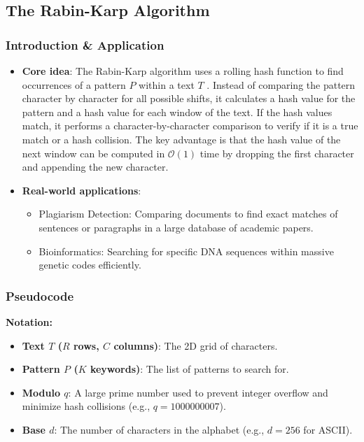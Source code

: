\subsection{The Rabin-Karp Algorithm}

\subsubsection{Introduction \& Application}
\begin{itemize}
    \item \textbf{Core idea}: The Rabin-Karp algorithm uses a rolling hash function to find occurrences of a pattern $P$ within a text $T$ \cite{cormen2022introduction}. 
    Instead of comparing the pattern character by character for all possible shifts, it calculates a hash value for the pattern and a hash value for each window of the text. 
    If the hash values match, it performs a character-by-character comparison to verify if it is a true match or a hash collision. 
    The key advantage is that the hash value of the next window can be computed in $\mathcal{O}(1)$ time by dropping the first character and appending the new character.
    \item \textbf{Real-world applications}:
    \begin{itemize}
        \item Plagiarism Detection: Comparing documents to find exact matches of sentences or paragraphs in a large database of academic papers.
        \item Bioinformatics: Searching for specific DNA sequences within massive genetic codes efficiently.
    \end{itemize}
\end{itemize}

\subsubsection{Pseudocode}
\textbf{Notation:}
\begin{itemize}
    \item \textbf{Text $T$ ($R$ rows, $C$ columns)}: The 2D grid of characters.
    \item \textbf{Pattern $P$ ($K$ keywords)}: The list of patterns to search for.
    \item \textbf{Modulo $q$}: A large prime number used to prevent integer overflow and minimize hash collisions (e.g., $q = 1000000007$).
    \item \textbf{Base $d$}: The number of characters in the alphabet (e.g., $d = 256$ for ASCII).
\end{itemize}

